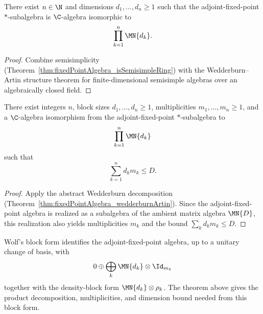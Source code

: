 \begin{theorem}%
    \label{thm:fixedPointAlgebra_wedderburnArtin}
    \leanok
    There exist $n\in\N$ and dimensions $d_1,\ldots,d_n\ge 1$ such that
    the adjoint-fixed-point $*$-subalgebra is $\C$-algebra isomorphic to
    \[
        \prod_{k=1}^{n} \MN{d_k}.
    \]
\end{theorem}

\begin{proof}
    \leanok
    Combine semisimplicity (Theorem~\ref{thm:fixedPointAlgebra_isSemisimpleRing})
    with the Wedderburn--Artin structure theorem for finite-dimensional
    semisimple algebras over an algebraically closed field.
\end{proof}

\begin{theorem}%
    \label{thm:adjointFixedPoints_wedderburnDecomp}
    \leanok
    There exist integers $n$, block sizes $d_1,\ldots,d_n \ge 1$,
    multiplicities $m_1,\ldots,m_n \ge 1$, and a $\C$-algebra isomorphism from
    the adjoint-fixed-point $*$-subalgebra to
    \[
        \prod_{k=1}^{n} \MN{d_k}
    \]
    such that
    \[
        \sum_{k=1}^{n} d_k m_k \le D.
    \]
\end{theorem}
\begin{proof}
    \leanok
    Apply the abstract Wedderburn decomposition
    (Theorem~\ref{thm:fixedPointAlgebra_wedderburnArtin}).
    Since the adjoint-fixed-point algebra is realized as a subalgebra of the
    ambient matrix algebra $\MN{D}$, this realization also yields
    multiplicities $m_k$ and the bound $\sum_k d_k m_k \le D$.
\end{proof}

\begin{remark}
    Wolf's block form identifies the adjoint-fixed-point algebra, up to a
    unitary change of basis, with
    \[
        0 \oplus \bigoplus_k \MN{d_k} \otimes \Id_{m_k}
    \]
    together with the density-block form $\MN{d_k} \otimes \rho_k$.
    The theorem above gives the product decomposition, multiplicities, and
    dimension bound needed from this block form.
\end{remark}

